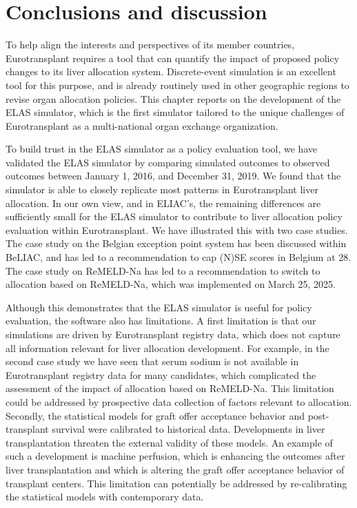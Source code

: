 \documentclass[11pt,twoside,]{book}
\begin{document}
\section{Conclusions and discussion}\label{sec:elasconclusion}

To help align the interests and perspectives of its member countries,
Eurotransplant requires a tool that can quantify the impact of proposed policy
changes to its liver allocation system. Discrete-event simulation is an excellent tool for this purpose, and
is already routinely used in other geographic regions to revise organ allocation
policies. This chapter reports on the development of the ELAS simulator, which is the first simulator
tailored to the unique challenges of Eurotransplant as a multi-national
organ exchange organization.

To build trust in the ELAS simulator as a policy evaluation tool, we
have validated the ELAS simulator by comparing simulated outcomes to
observed outcomes between January 1, 2016, and December 31, 2019. We found
that the simulator is able to closely replicate most
patterns in Eurotransplant liver allocation. In our own view, and in ELIAC's, the remaining differences are sufficiently small for the
ELAS simulator to contribute to liver allocation policy evaluation
within Eurotransplant. We have illustrated this with two case studies.
The case study on the Belgian exception point system has been discussed within
BeLIAC, and has led to a recommendation to cap (N)SE scores in Belgium at 28.
The case study on ReMELD-Na has led to a recommendation to switch to allocation
based on ReMELD-Na, which was implemented on March 25, 2025.

Although this demonstrates that the ELAS simulator is useful for policy
evaluation, the software also has limitations. A first limitation is that our
simulations are driven by Eurotransplant registry data, which does not capture all information relevant
for liver allocation development. For example, in the second case study we have seen that
serum sodium is not available in Eurotransplant registry data for many candidates, which
complicated the assessment of the impact of allocation based on ReMELD-Na. This limitation could be addressed by prospective
data collection of factors relevant to allocation. Secondly, the statistical models
for graft offer acceptance behavior and post-transplant survival were calibrated
to historical data. Developments in liver transplantation threaten the external validity of
these models. An example of such a development is machine perfusion,
which is enhancing the outcomes after liver transplantation
\citep{terraultLiverTransplantation20232023} and which is altering the graft offer
acceptance behavior of transplant centers. This limitation can
potentially be addressed by re-calibrating the statistical models with
contemporary data.
\end{document}
